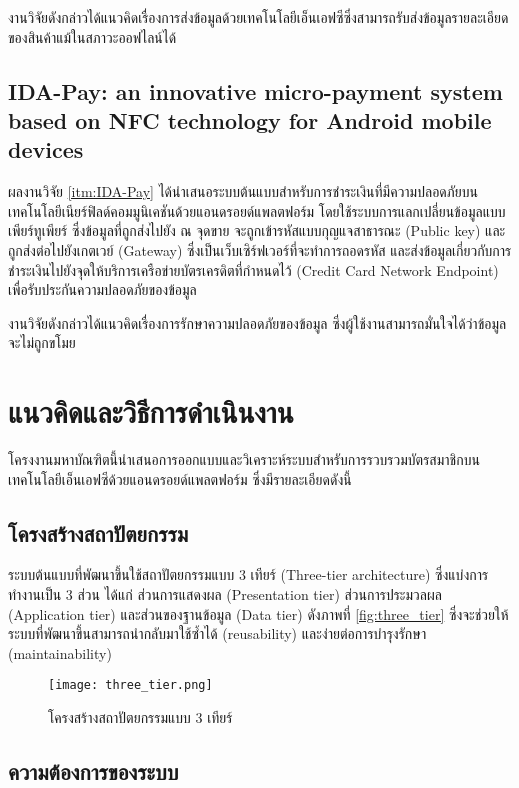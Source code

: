 \documentclass[a4paper]{article}
\begin{document}
งานวิจัยดังกล่าวได้แนวคิดเรื่องการส่งข้อมูลด้วยเทคโนโลยีเอ็นเอฟซีซึ่งสามารถรับส่งข้อมูลรายละเอียดของสินค้าแม้ในสภาวะออฟไลน์ได้

\subsection{IDA-Pay: an innovative micro-payment system based on NFC technology for Android mobile devices}
ผลงานวิจัย \ref{itm:IDA-Pay} ได้นำเสนอระบบต้นแบบสำหรับการชำระเงินที่มีความปลอดภัยบนเทคโนโลยีเนียร์ฟิลด์คอมมูนิเคชันด้วยแอนดรอยด์แพลตฟอร์ม โดยใช้ระบบการแลกเปลี่ยนข้อมูลแบบเพียร์ทูเพียร์ ซึ่งข้อมูลที่ถูกส่งไปยัง ณ จุดขาย จะถูกเข้ารหัสแบบกุญแจสาธารณะ (Public key) และถูกส่งต่อไปยังเกตเวย์ (Gateway) ซึ่งเป็นเว็บเซิร์ฟเวอร์ที่จะทำการถอดรหัส และส่งข้อมูลเกี่ยวกับการชำระเงินไปยังจุดให้บริการเครือข่ายบัตรเครดิตที่กำหนดไว้ (Credit Card Network Endpoint) เพื่อรับประกันความปลอดภัยของข้อมูล

งานวิจัยดังกล่าวได้แนวคิดเรื่องการรักษาความปลอดภัยของข้อมูล ซึ่งผู้ใช้งานสามารถมั่นใจได้ว่าข้อมูลจะไม่ถูกขโมย


\section{แนวคิดและวิธีการดำเนินงาน}
โครงงานมหาบัณฑิตนี้นําเสนอการออกแบบและวิเคราะห์ระบบสำหรับการรวบรวมบัตรสมาชิกบนเทคโนโลยีเอ็นเอฟซีด้วยแอนดรอยด์แพลตฟอร์ม ซึ่งมีรายละเอียดดังนี้

\subsection{โครงสร้างสถาปัตยกรรม}
ระบบต้นแบบที่พัฒนาขึ้นใช้สถาปัตยกรรมแบบ 3 เทียร์ (Three-tier architecture) ซึ่งแบ่งการทำงานเป็น 3 ส่วน ได้แก่ ส่วนการแสดงผล (Presentation tier) ส่วนการประมวลผล (Application tier) และส่วนของฐานข้อมูล (Data tier) ดังภาพที่ \ref{fig:three_tier} ซึ่งจะช่วยให้ระบบที่พัฒนาขึ้นสามารถนำกลับมาใช้ซ้ำได้ (reusability) และง่ายต่อการบำรุงรักษา (maintainability)

\begin{figure}[ht!]
\centering
\texttt{[image: three\_tier.png]}
\caption{โครงสร้างสถาปัตยกรรมแบบ 3 เทียร์} \label{fig:three_tier}
\label{overflow}
\end{figure}

\subsection{ความต้องการของระบบ}
\end{document}

